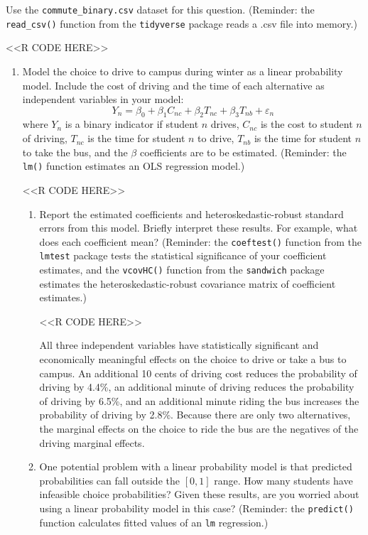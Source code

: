 \documentclass[11pt,letterpaper]{article}
\begin{document}
Use the \texttt{commute\_binary.csv} dataset for this question. (Reminder: the \texttt{read\_csv()} function from the \texttt{tidyverse} package reads a .csv file into memory.)

<<R CODE HERE>>

\begin{enumerate}[label=\alph*., leftmargin=*]
	\item Model the choice to drive to campus during winter as a linear probability model. Include the cost of driving and the time of each alternative as independent variables in your model:
	$$Y_n = \beta_0 + \beta_1 C_{nc} + \beta_2 T_{nc} + \beta_3 T_{nb} + \varepsilon_{n}$$
	where $Y_n$ is a binary indicator if student $n$ drives, $C_{nc}$ is the cost to student $n$ of driving, $T_{nc}$ is the time for student $n$ to drive, $T_{nb}$ is the time for student $n$ to take the bus, and the $\beta$ coefficients are to be estimated. (Reminder: the \texttt{lm()} function estimates an OLS regression model.)

	<<R CODE HERE>>

	\begin{enumerate}[label=\roman*.]
		\item Report the estimated coefficients and heteroskedastic-robust standard errors from this model. Briefly interpret these results. For example, what does each coefficient mean? (Reminder: the \texttt{coeftest()} function from the \texttt{lmtest} package tests the statistical significance of your coefficient estimates, and the \texttt{vcovHC()} function from the \texttt{sandwich} package estimates the heteroskedastic-robust covariance matrix of coefficient estimates.)

		<<R CODE HERE>>

		All three independent variables have statistically significant and economically meaningful effects on the choice to drive or take a bus to campus. An additional 10 cents of driving cost reduces the probability of driving by 4.4\%, an additional minute of driving reduces the probability of driving by 6.5\%, and an additional minute riding the bus increases the probability of driving by 2.8\%. Because there are only two alternatives, the marginal effects on the choice to ride the bus are the negatives of the driving marginal effects.

		\item One potential problem with a linear probability model is that predicted probabilities can fall outside the $[0, 1]$ range. How many students have infeasible choice probabilities? Given these results, are you worried about using a linear probability model in this case? (Reminder: the \texttt{predict()} function calculates fitted values of an \texttt{lm} regression.)


\end{enumerate}
\end{enumerate}
\end{document}
